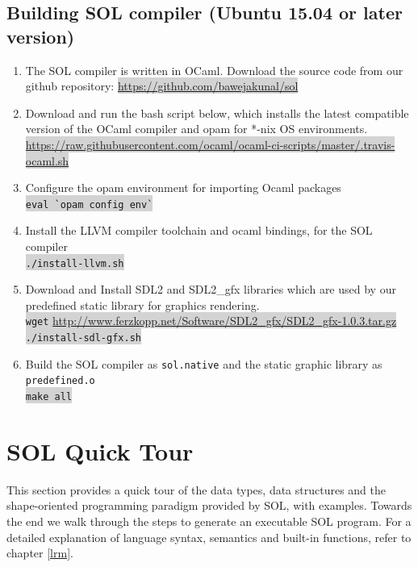 \documentclass[letterpaper,12pt]{report}
\begin{document}
    \subsection{Building SOL compiler (Ubuntu 15.04 or later version)}
    \begin{enumerate}
      \item The SOL compiler is written in OCaml. Download the source code from our github repository: \colorbox{lightgray}{{\href{https://github.com/bawejakunal/sol}{https://github.com/bawejakunal/sol}}}

      \item Download and run the bash script below, which installs the latest compatible version of the OCaml compiler and opam for *-nix OS environments.\\
      \colorbox{lightgray}{{\href{https://raw.githubusercontent.com/ocaml/ocaml-ci-scripts/master/.travis-ocaml.sh}{https://raw.githubusercontent.com/ocaml/ocaml-ci-scripts/master/.travis-ocaml.sh}}}

      \item Configure the opam environment for importing Ocaml packages\\
      \colorbox{lightgray}{\lstinline[style=bash]{eval `opam config env`}}

      \item Install the LLVM compiler toolchain and ocaml bindings, for the SOL compiler\\
      \colorbox{lightgray}{\lstinline[style=bash]{./install-llvm.sh}}

      \item Download and Install SDL2 and SDL2\_gfx libraries which are used by our predefined static library for graphics rendering.\\
        \colorbox{lightgray}{\lstinline[style=bash]{wget} \href{http://www.ferzkopp.net/Software/SDL2\_gfx/SDL2\_gfx-1.0.3.tar.gz}{http://www.ferzkopp.net/Software/SDL2\_gfx/SDL2\_gfx-1.0.3.tar.gz}}\\
        \colorbox{lightgray}{\lstinline[style=bash]{./install-sdl-gfx.sh}}

      \item Build the SOL compiler as \texttt{sol.native} and the static graphic library as \texttt{predefined.o}\\
      \colorbox{lightgray}{\lstinline[style=bash]{make all}}

    \end{enumerate}

  \section{SOL Quick Tour}
  This section provides a quick tour of the data types, data structures and the shape-oriented programming paradigm provided by SOL, with examples. Towards the end we walk through the steps to generate an executable SOL program. For a detailed explanation of language syntax, semantics and built-in functions, refer to chapter \ref{lrm}.
\end{document}
